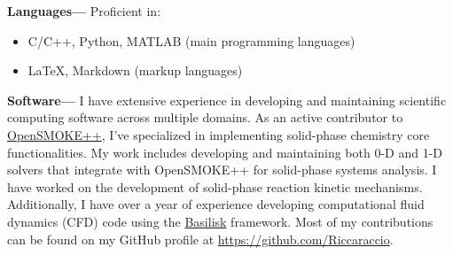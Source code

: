 {\bf Languages---}
Proficient in:
\begin{itemize}
    \item C/C++, Python, MATLAB (main programming languages)
    \item \LaTeX, Markdown (markup languages)
\end{itemize}



{\bf Software---}
I have extensive experience in developing and maintaining scientific computing software across multiple domains. As an active contributor to \href{https://www.opensmokepp.polimi.it/}{OpenSMOKE++}, I've specialized in implementing solid-phase chemistry core functionalities. My work includes developing and maintaining both 0-D and 1-D solvers that integrate with OpenSMOKE++ for solid-phase systems analysis. I have worked on the development of solid-phase reaction kinetic mechanisms. Additionally, I have over a year of experience developing computational fluid dynamics (CFD) code using the \href{www.basilisk.fr}{Basilisk} framework. Most of my contributions can be found on my GitHub profile at \href{https://github.com/Riccaraccio}{https://github.com/Riccaraccio}.

